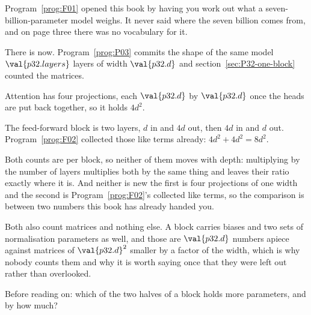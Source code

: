 \begin{fr}
Program~\ref{prog:F01} opened this book by having you work out what a
seven-billion-parameter model weighs. It never said where the seven billion
comes from, and on page three there was no vocabulary for it.

There is now. Program~\ref{prog:P03} commits the shape of the same model
\dash{} $\val{p32.layers}$ layers of width $\val{p32.d}$ \dash{} and
section~\ref{sec:P32-one-block} counted the matrices.

Attention has four projections, each $\val{p32.d}$ by $\val{p32.d}$ once the
heads are put back together, so it holds $4d^{2}$.

The feed-forward block is two layers, $d$ in and $4d$ out, then $4d$ in and
$d$ out. Program~\ref{prog:F02} collected those like terms already:
$4d^{2} + 4d^{2} = 8d^{2}$.

Both counts are per block, so neither of them moves with depth: multiplying
by the number of layers multiplies both by the same thing and leaves their
ratio exactly where it is. And neither is new \dash{} the first is four
projections of one width and the second is
Program~\ref{prog:F02}'s collected like terms, so the comparison is between
two numbers this book has already handed you.

Both also count matrices and nothing else. A block carries biases and two
sets of normalisation parameters as well, and those are $\val{p32.d}$ numbers
apiece against matrices of $\val{p32.d}^{2}$ \dash{} smaller by a factor of
the width, which is why nobody counts them and why it is worth saying once
that they were left out rather than overlooked.

Before reading on: which of the two halves of a block holds more parameters,
and by how much?
\dotline
\nextframe
\end{fr}

